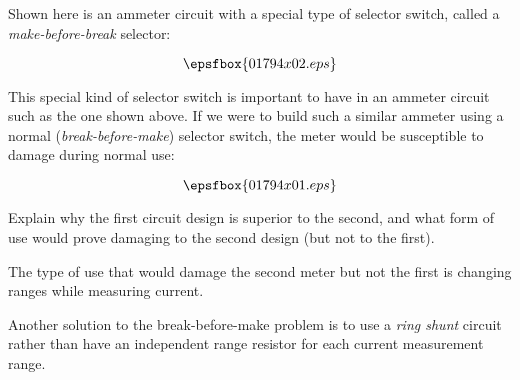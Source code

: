 

Shown here is an ammeter circuit with a special type of selector switch, called a {\it make-before-break} selector:

$$\epsfbox{01794x02.eps}$$

This special kind of selector switch is important to have in an ammeter circuit such as the one shown above.  If we were to build such a similar ammeter using a normal ({\it break-before-make}) selector switch, the meter would be susceptible to damage during normal use:

$$\epsfbox{01794x01.eps}$$

Explain why the first circuit design is superior to the second, and what form of use would prove damaging to the second design (but not to the first).







The type of use that would damage the second meter but not the first is changing ranges while measuring current.







Another solution to the break-before-make problem is to use a {\it ring shunt} circuit rather than have an independent range resistor for each current measurement range.




